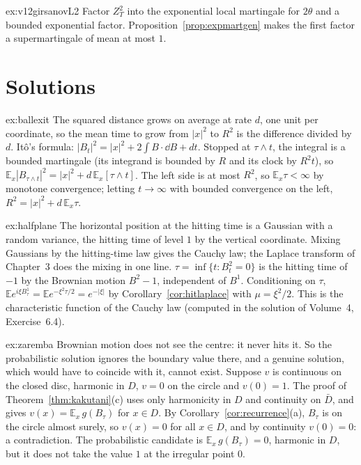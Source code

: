 \begin{hint}{ex:v12girsanovL2}
Factor $Z_T^2$ into the exponential local martingale for $2\theta$ and a bounded exponential factor. Proposition~\ref{prop:expmartgen} makes the first factor a supermartingale of mean at most $1$.
\end{hint}

\section{Solutions}

\begin{solution}{ex:ballexit}
\idea The squared distance grows on average at rate $d$, one unit per coordinate, so the mean time to grow from $|x|^2$ to $R^2$ is the difference divided by $d$.
\writeup It\^o's formula: $|B_t|^2=|x|^2+2\int B\cdot\dd B+dt$. Stopped at $\tau\wedge t$, the integral is a bounded martingale (its integrand is bounded by $R$ and its clock by $R^2t$), so $\mathbb E_x|B_{\tau\wedge t}|^2=|x|^2+d\,\mathbb E_x[\tau\wedge t]$.
The left side is at most $R^2$, so $\mathbb E_x\tau<\infty$ by monotone convergence; letting $t\to\infty$ with bounded convergence on the left, $R^2=|x|^2+d\,\mathbb E_x\tau$.
\end{solution}

\begin{solution}{ex:halfplane}
\idea The horizontal position at the hitting time is a Gaussian with a random variance, the hitting time of level $1$ by the vertical coordinate. Mixing Gaussians by the hitting-time law gives the Cauchy law; the
Laplace transform of Chapter~3 does the mixing in one line.
\writeup $\tau=\inf\{t:B^2_t=0\}$ is the hitting time of $-1$ by the Brownian motion $B^2-1$, independent of $B^1$. Conditioning on $\tau$, $\mathbb Ee^{i\xi B^1_\tau}=\mathbb Ee^{-\xi^2\tau/2}=e^{-|\xi|}$ by Corollary~\ref{cor:hitlaplace} with
$\mu=\xi^2/2$. This is the characteristic function of the Cauchy law (computed in the solution of Volume~4, Exercise~6.4).
\end{solution}

\begin{solution}{ex:zaremba}
\idea Brownian motion does not see the centre: it never hits it. So the probabilistic solution ignores the boundary value there, and a genuine solution, which would have to coincide with it, cannot exist.
\writeup Suppose $v$ is continuous on the closed disc, harmonic in $D$, $v=0$ on the circle and $v(0)=1$. The proof of Theorem~\ref{thm:kakutani}(c) uses only harmonicity in $D$ and continuity on $\bar D$, and gives
$v(x)=\mathbb E_x\,g(B_\tau)$ for $x\in D$. By Corollary~\ref{cor:recurrence}(a), $B_\tau$ is on the circle almost surely, so $v(x)=0$ for all $x\in D$, and by continuity $v(0)=0$: a contradiction. The probabilistic candidate is
$\mathbb E_x\,g(B_\tau)=0$, harmonic in $D$, but it does not take the value $1$ at the irregular point $0$.
\end{solution}


